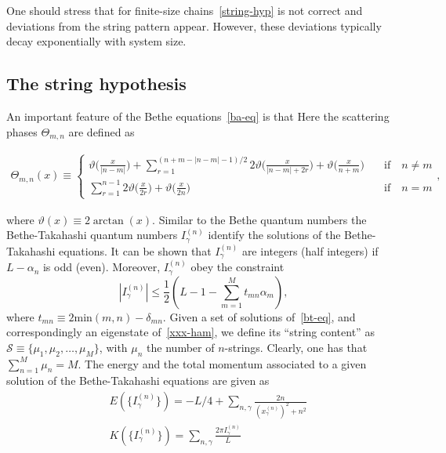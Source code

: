 \documentclass[twocolumn,superscriptaddress,prb,10pt]{revtex4-1}
\begin{document}
One should stress that for finite-size chains~\eqref{string-hyp} is not 
correct and deviations from the string pattern appear. However, these 
deviations typically decay exponentially with system size. 




\subsection{The string hypothesis}

An important feature of the Bethe equations~\eqref{ba-eq} is that Here the scattering phases $\Theta_{m,n}$ are defined as 
%
\begin{widetext}
\begin{eqnarray}
\nonumber\Theta_{m,n}(x)\equiv\left\{\begin{array}{cc}
\vartheta\big(\frac{x}{|n-m|}\big)+\!\!\!\!\!\sum
\limits_{r=1}^{(n+m-|n-m|-1)/2}\!\!\!\!\!2\vartheta\big(\frac{x}
{|n-m|+2r}\big)+\vartheta\big(\frac{x}{n+m}\big) & \quad\mbox{if}
\quad n\ne m\\\sum\limits_{r=1}^{n-1}2\vartheta\big(\frac{x}{2r}\big)+
\vartheta\big(\frac{x}{2n}\big) & \quad\mbox{if}\quad n=m
\end{array}\right.,
\end{eqnarray}
\end{widetext}
%
where $\vartheta(x)\equiv 2\arctan(x)$. Similar to the Bethe quantum numbers 
the Bethe-Takahashi quantum numbers $I_{\gamma}^{(n)}$ identify the solutions 
of the Bethe-Takahashi equations. It can be shown that $I_\gamma^{(n)}$ are 
integers (half integers) if $L-\alpha_n$ is odd (even). Moreover, 
$I_\gamma^{(n)}$ obey the constraint 
%
\begin{equation}
\label{bt-bounds}
|I_\gamma^{(n)}|\le\frac{1}{2}(L-1-\sum\limits_{m=1}^Mt_{mn}\alpha_m),
\end{equation}
%
where $t_{mn}\equiv 2\textrm{min}(m,n)-\delta_{mn}$. 
Given a set of solutions of~\eqref{bt-eq}, and correspondingly an eigenstate 
of~\eqref{xxx-ham}, we define its ``string content'' as ${\mathcal S}\equiv
\{\mu_1,\mu_2,\dots,\mu_M\}$, with $\mu_n$ the number of $n$-strings. Clearly, 
one has that $\sum_{n=1}^M\mu_n=M$. The energy and the total momentum 
associated to a given solution of the Bethe-Takahashi equations are given as 
%
\begin{align}
& E(\{I_\gamma^{(n)}\})=-L/4+\sum\limits_{n,\gamma}\frac{2n}{
(x_\gamma^{(n)})^2+n^2}\\
& K(\{I_\gamma^{(n)}\})=\sum\limits_{n,\gamma}\frac{2\pi 
I_\gamma^{(n)}}{L}
\end{align}
%
\end{document}
